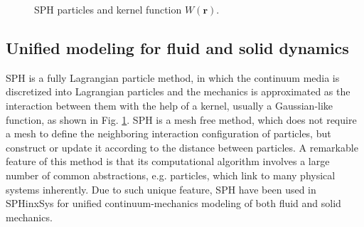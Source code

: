 \documentclass[12pt, a4paper,onecolumn]{article}
\begin{document}
%
\begin{figure}
	\vspace*{-12pt}
	\caption{SPH particles and kernel function $W(\mathbf{r})$.}
	\label{figs:sph}
	\vspace*{-12pt}
\end{figure}
%
\subsection{Unified modeling for fluid and solid dynamics}
SPH is a fully Lagrangian particle method,  
in which the continuum media is discretized into Lagrangian particles
and the mechanics is approximated as the interaction between them
with the help of a kernel, usually a Gaussian-like function, as shown in Fig. \ref{figs:sph}. 
SPH is a mesh free method, which does not require a mesh to define 
the neighboring interaction configuration of particles, 
but construct or update it according to the distance between particles.
A remarkable feature of this method is that its computational algorithm 
involves a large number of common abstractions, e.g. particles,  
which link to many physical systems inherently. 
Due to such unique feature,
SPH have been used in SPHinxSys for unified continuum-mechanics 
modeling of both fluid and solid mechanics.
\end{document}
